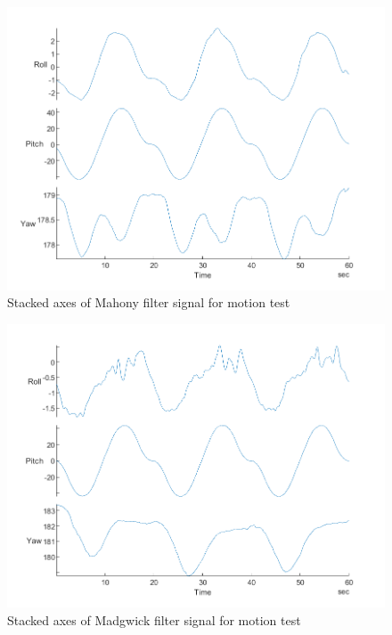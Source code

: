 \begin{figure}[H]
    \centering
    \includegraphics[scale=1]{graphics/Navigation/StackedMotionMahony.png}
    \caption{Stacked axes of Mahony filter signal for motion test}
     \label{fig:Stacked axes of Mahony filter signal for motion test}
\end{figure}

\begin{figure}[H]
    \centering
    \includegraphics[scale=1]{graphics/Navigation/StackedMotionMadgwick.png}
    \caption{Stacked axes of Madgwick filter signal for motion test}
     \label{fig:Stacked axes of Madgwick filter signal for motion test}
\end{figure}


